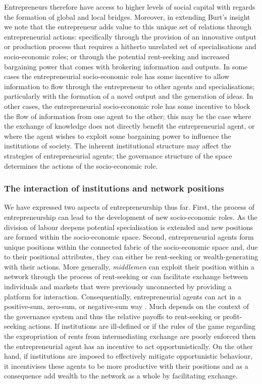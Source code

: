 Entrepreneurs therefore have access to higher levels of social capital with regards the formation of global and local bridges. Moreover, in extending Burt's insight we note that the entrepreneur adds value to this unique set of relations through entrepreneurial actions: specifically through the provision of an innovative output or production process that requires a hitherto unrelated set of specialisations and socio-economic roles; or through the potential rent-seeking and increased bargaining power that comes with brokering information and outputs. In some cases the entrepreneurial socio-economic role has some incentive to allow information to flow through the entrepreneur to other agents and specialisations; particularly with the formation of a novel output and the generation of ideas. In other cases, the entrepreneurial socio-economic role has some incentive to block the flow of information from one agent to the other; this may be the case where the exchange of knowledge does not directly benefit the entrepreneurial agent, or where the agent wishes to exploit some bargaining power to influence the institutions of society. The inherent institutional structure may affect the strategies of entrepreneurial agents; the governance structure of the space determines the actions of the socio-economic role.

\subsubsection{The interaction of institutions and network positions}

We have expressed two aspects of entrepreneurship thus far. First, the process of entrepreneurship can lead to the development of new socio-economic roles. As the division of labour deepens potential specialisation is extended and new positions are formed within the socio-economic space. Second, entrepreneurial agents form unique positions within the connected fabric of the socio-economic space and, due to their positional attributes, they can either be rent-seeking or wealth-generating with their actions. More generally, \emph{middlemen} can exploit their position within a network through the process of rent-seeking or can facilitate exchange between individuals and markets that were previously unconnected by providing a platform for interaction. Consequentially, entrepreneurial agents can act in a positive-sum, zero-sum, or negative-sum way \citep{Krakovsky2015}. Much depends on the context of the governance system and thus the relative payoffs to rent-seeking or profit-seeking actions. If institutions are ill-defined or if the rules of the game regarding the expropriation of rents from intermediating exchange are poorly enforced then the entrepreneurial agent has an incentive to act opportunistically. On the other hand, if institutions are imposed to effectively mitigate opportunistic behaviour, it incentivises these agents to be more productive with their positions and as a consequence add wealth to the network as a whole by facilitating exchange.

